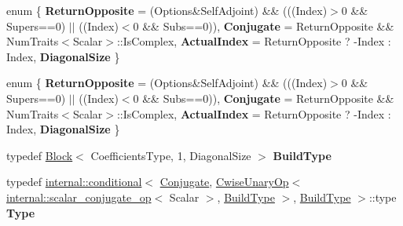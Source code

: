 \begin{DoxyCompactItemize}
\item 
\mbox{\label{struct_eigen_1_1internal_1_1_band_matrix_base_1_1_diagonal_int_return_type_a22002f7ade0fba2e11f59f11f3126e0d}} 
enum \{ {\bfseries Return\+Opposite} = (Options\&Self\+Adjoint) \&\& (((Index)$>$0 \&\& Supers==0) $\vert$$\vert$ ((Index)$<$0 \&\& Subs==0)), 
{\bfseries Conjugate} = Return\+Opposite \&\& Num\+Traits$<$Scalar$>$\+:\+:Is\+Complex, 
{\bfseries Actual\+Index} = Return\+Opposite ? -\/\+Index \+: Index, 
{\bfseries Diagonal\+Size}
 \}
\item 
\mbox{\label{struct_eigen_1_1internal_1_1_band_matrix_base_1_1_diagonal_int_return_type_a9594243eab44fe0a05a412d2809f333b}} 
enum \{ {\bfseries Return\+Opposite} = (Options\&Self\+Adjoint) \&\& (((Index)$>$0 \&\& Supers==0) $\vert$$\vert$ ((Index)$<$0 \&\& Subs==0)), 
{\bfseries Conjugate} = Return\+Opposite \&\& Num\+Traits$<$Scalar$>$\+:\+:Is\+Complex, 
{\bfseries Actual\+Index} = Return\+Opposite ? -\/\+Index \+: Index, 
{\bfseries Diagonal\+Size}
 \}
\item 
\mbox{\label{struct_eigen_1_1internal_1_1_band_matrix_base_1_1_diagonal_int_return_type_af5b1872c1f56aea6549d756fa9b4b140}} 
typedef \hyperlink{group___core___module_class_eigen_1_1_block}{Block}$<$ Coefficients\+Type, 1, Diagonal\+Size $>$ {\bfseries Build\+Type}
\item 
\mbox{\label{struct_eigen_1_1internal_1_1_band_matrix_base_1_1_diagonal_int_return_type_ab71da0865441b0fdc0cfa64491dd3e00}} 
typedef \hyperlink{struct_eigen_1_1internal_1_1conditional}{internal\+::conditional}$<$ \hyperlink{class_eigen_1_1_conjugate}{Conjugate}, \hyperlink{group___core___module_class_eigen_1_1_cwise_unary_op}{Cwise\+Unary\+Op}$<$ \hyperlink{struct_eigen_1_1internal_1_1scalar__conjugate__op}{internal\+::scalar\+\_\+conjugate\+\_\+op}$<$ Scalar $>$, \hyperlink{group___core___module_class_eigen_1_1_block}{Build\+Type} $>$, \hyperlink{group___core___module_class_eigen_1_1_block}{Build\+Type} $>$\+::type {\bfseries Type}
\item 

\end{DoxyCompactItemize}
